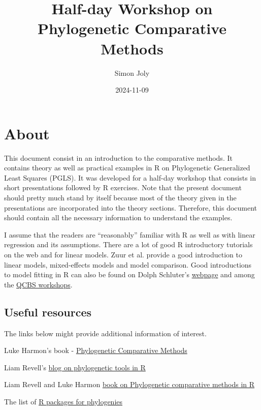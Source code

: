 \documentclass[
]{book}
\title{Half-day Workshop on Phylogenetic Comparative Methods}
\author{Simon Joly}
\date{2024-11-09}
\begin{document}
\maketitle

{
\setcounter{tocdepth}{1}
\tableofcontents
}
\chapter{About}\label{about}

This document consist in an introduction to the comparative methods. It contains theory as well as practical examples in R on Phylogenetic Generalized Least Squares (PGLS). It was developed for a half-day workshop that consists in short presentations followed by R exercises. Note that the present document should pretty much stand by itself because most of the theory given in the presentations are incorporated into the theory sections. Therefore, this document should contain all the necessary information to understand the examples.

I assume that the readers are ``reasonably'' familiar with R as well as with linear regression and its assumptions. There are a lot of good R introductory tutorials on the web and for linear models. Zuur et al. \citep{zuur2007analysing} provide a good introduction to linear models, mixed-effects models and model comparison. Good introductions to model fitting in R can also be found on Dolph Schluter's \href{https://www.zoology.ubc.ca/~schluter/R/fit-model/}{webpage} and among the \href{http://qcbs.ca/wiki/r_workshop4}{QCBS workshops}.

\section{Useful resources}\label{useful-resources}

The links below might provide additional information of interest.

Luke Harmon's book - \href{https://lukejharmon.github.io/pcm/}{Phylogenetic Comparative Methods}

Liam Revell's \href{http://blog.phytools.org/}{blog on phylogenetic tools in R}

Liam Revell and Luke Harmon \href{https://press.princeton.edu/books/ebook/9780691219042/phylogenetic-comparative-methods-in-r}{book on Phylogenetic comparative methods in R}

The list of \href{https://cran.r-project.org/web/views/Phylogenetics.html}{R packages for phylogenies}
\end{document}
